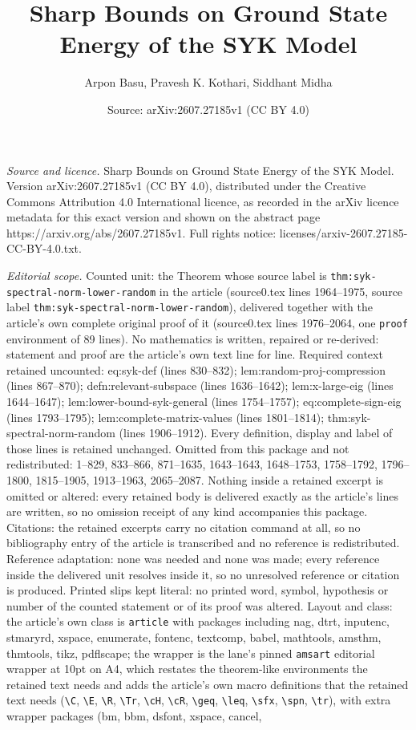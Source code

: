 \documentclass[10pt,a4paper]{amsart}
\title[Sharp Bounds on Ground State Energy of the SYK Model]{Sharp Bounds on Ground State Energy of the SYK Model}
\author{Arpon Basu, Pravesh K. Kothari, Siddhant Midha}
\date{Source: arXiv:2607.27185v1 (CC BY 4.0)}
\begin{document}
\maketitle

\noindent\emph{Source and licence.} Sharp Bounds on Ground State Energy of the SYK Model. Version arXiv:2607.27185v1 (CC BY 4.0), distributed under the Creative Commons Attribution 4.0 International licence, as recorded in the arXiv licence metadata for this exact version and shown on the abstract page https://arxiv.org/abs/2607.27185v1. Full rights notice: licenses/arxiv-2607.27185-CC-BY-4.0.txt.\par\smallskip

\noindent\textit{Editorial scope.} Counted unit: the Theorem whose source label is \texttt{thm:syk-spectral-norm-lower-random} in the article (source0.tex lines 1964--1975, source label \texttt{thm:syk-spectral-norm-lower-random}), delivered together with the article's own complete original proof of it (source0.tex lines 1976--2064, one \texttt{proof} environment of 89 lines). No mathematics is written, repaired or re-derived: statement and proof are the article's own text line for line. Required context retained uncounted: eq:syk-def (lines 830--832); lem:random-proj-compression (lines 867--870); defn:relevant-subspace (lines 1636--1642); lem:x-large-eig (lines 1644--1647); lem:lower-bound-syk-general (lines 1754--1757); eq:complete-sign-eig (lines 1793--1795); lem:complete-matrix-values (lines 1801--1814); thm:syk-spectral-norm-random (lines 1906--1912). Every definition, display and label of those lines is retained unchanged. Omitted from this package and not redistributed: 1--829, 833--866, 871--1635, 1643--1643, 1648--1753, 1758--1792, 1796--1800, 1815--1905, 1913--1963, 2065--2087. Nothing inside a retained excerpt is omitted or altered: every retained body is delivered exactly as the article's lines are written, so no omission receipt of any kind accompanies this package. Citations: the retained excerpts carry no citation command at all, so no bibliography entry of the article is transcribed and no reference is redistributed. Reference adaptation: none was needed and none was made; every reference inside the delivered unit resolves inside it, so no unresolved reference or citation is produced. Printed slips kept literal: no printed word, symbol, hypothesis or number of the counted statement or of its proof was altered. Layout and class: the article's own class is \texttt{article} with packages including nag, dtrt, inputenc, stmaryrd, xspace, enumerate, fontenc, textcomp, babel, mathtools, amsthm, thmtools, tikz, pdflscape; the wrapper is the lane's pinned \texttt{amsart} editorial wrapper at 10pt on A4, which restates the theorem-like environments the retained text needs and adds the article's own macro definitions that the retained text needs (\texttt{\textbackslash C}, \texttt{\textbackslash E}, \texttt{\textbackslash R}, \texttt{\textbackslash Tr}, \texttt{\textbackslash cH}, \texttt{\textbackslash cR}, \texttt{\textbackslash geq}, \texttt{\textbackslash leq}, \texttt{\textbackslash sfx}, \texttt{\textbackslash spn}, \texttt{\textbackslash tr}), with extra wrapper packages (bm, bbm, dsfont, xspace, cancel, 
\end{document}
